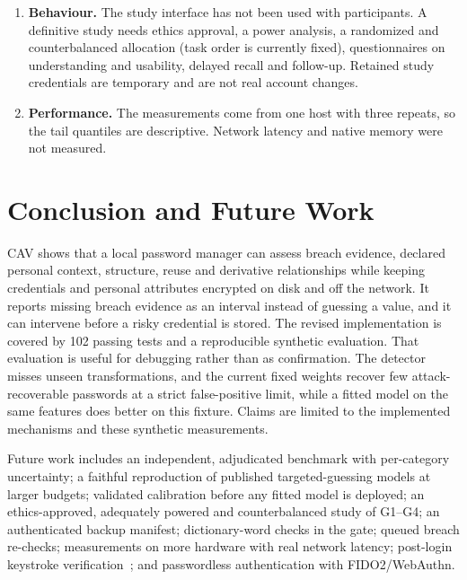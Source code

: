 \documentclass[conference]{IEEEtran}
\begin{document}
\begin{enumerate}
\item \textbf{Behaviour.} The study interface has not been used with participants. A definitive study needs ethics approval, a power analysis, a randomized and counterbalanced allocation (task order is currently fixed), questionnaires on understanding and usability, delayed recall and follow-up. Retained study credentials are temporary and are not real account changes.
\item \textbf{Performance.} The measurements come from one host with three repeats, so the tail quantiles are descriptive. Network latency and native memory were not measured.
\end{enumerate}

\section{Conclusion and Future Work}
CAV shows that a local password manager can assess breach evidence, declared personal context, structure, reuse and derivative relationships while keeping credentials and personal attributes encrypted on disk and off the network. It reports missing breach evidence as an interval instead of guessing a value, and it can intervene before a risky credential is stored. The revised implementation is covered by 102 passing tests and a reproducible synthetic evaluation. That evaluation is useful for debugging rather than as confirmation. The detector misses unseen transformations, and the current fixed weights recover few attack-recoverable passwords at a strict false-positive limit, while a fitted model on the same features does better on this fixture. Claims are limited to the implemented mechanisms and these synthetic measurements.

Future work includes an independent, adjudicated benchmark with per-category uncertainty; a faithful reproduction of published targeted-guessing models at larger budgets; validated calibration before any fitted model is deployed; an ethics-approved, adequately powered and counterbalanced study of G1--G4; an authenticated backup manifest; dictionary-word checks in the gate; queued breach re-checks; measurements on more hardware with real network latency; post-login keystroke verification~\cite{parkinson,rusli}; and passwordless authentication with FIDO2/WebAuthn.
\end{document}
